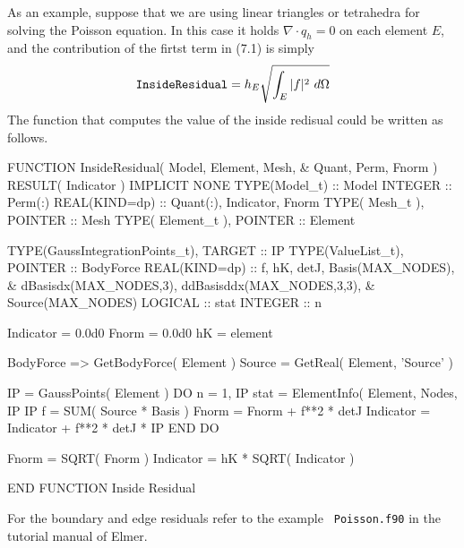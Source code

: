 As an example, suppose that we are using linear triangles or tetrahedra
for solving the Poisson equation. In this case it holds $\nabla \cdot
q_h=0$ on each element $E$, and the contribution of the firtst term
in (7.1) is simply
\begin{equation}
{\tt InsideResidual} = h_E\sqrt{ \int_E |f|^2 \ d\Omega}
\end{equation}
The function that computes the value of the inside redisual could 
be written as follows.

\ttbegin
FUNCTION InsideResidual( Model, Element, Mesh, &
        Quant, Perm, Fnorm ) RESULT( Indicator )
  IMPLICIT NONE
  TYPE(Model_t) :: Model
  INTEGER :: Perm(:)
  REAL(KIND=dp) :: Quant(:), Indicator, Fnorm
  TYPE( Mesh_t ), POINTER    :: Mesh
  TYPE( Element_t ), POINTER :: Element

  TYPE(GaussIntegrationPoints_t), TARGET :: IP
  TYPE(ValueList_t), POINTER :: BodyForce
  REAL(KIND=dp) :: f, hK, detJ, Basis(MAX_NODES), &
    dBasisdx(MAX_NODES,3), ddBasisddx(MAX_NODES,3,3), &
    Source(MAX_NODES)
  LOGICAL :: stat
  INTEGER :: n

  Indicator = 0.0d0
  Fnorm = 0.0d0
  hK = element %

  BodyForce => GetBodyForce( Element )
  Source = GetReal( Element, 'Source' )

  IP = GaussPoints( Element )
  DO n = 1, IP %
    stat = ElementInfo( Element, Nodes, IP %
        IP %
    f = SUM( Source * Basis )
    Fnorm = Fnorm + f**2 * detJ %
    Indicator = Indicator + f**2 * detJ * IP %
  END DO

  Fnorm = SQRT( Fnorm )
  Indicator = hK * SQRT( Indicator )

END FUNCTION Inside Residual

\ttend
For the boundary and edge residuals refer to the example {\tt
Poisson.f90} in the tutorial manual of Elmer.










